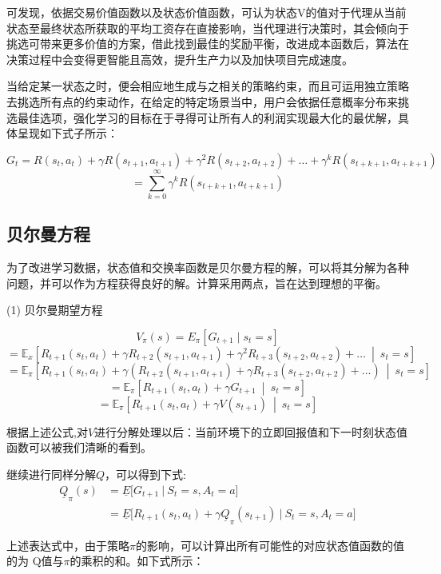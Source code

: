 可发现，依据交易价值函数以及状态价值函数，可认为状态V的值对于代理从当前状态至最终状态所获取的平均工资存在直接影响，当代理进行决策时，其会倾向于挑选可带来更多价值的方案，借此找到最佳的奖励平衡，改进成本函数后，算法在决策过程中会变得更智能且高效，提升生产力以及加快项目完成速度。

当给定某一状态之时，便会相应地生成与之相关的策略约束，而且可运用独立策略去挑选所有点的约束动作，在给定的特定场景当中，用户会依据任意概率分布来挑选最佳选项，强化学习的目标在于寻得可让所有人的利润实现最大化的最优解，具体呈现如下式子所示：

\[
G_t = R(s_t, a_t) + \gamma R(s_{t+1}, a_{t+1}) + \gamma^2 R(s_{t+2}, a_{t+2}) + \ldots + \gamma^k R(s_{t+k+1}, a_{t+k+1})
\]
\[
= \sum_{k=0}^\infty \gamma^k R(s_{t+k+1}, a_{t+k+1})
\]

\subsection{贝尔曼方程}

为了改进学习数据，状态值和交换率函数是贝尔曼方程的解，可以将其分解为各种问题，并可以作为方程获得良好的解\cite{franccois2018introduction}。计算采用两点，旨在达到理想的平衡。

(1) 贝尔曼期望方程

\[
V_{\pi}(s) = E_{\pi} \left[ G_{t+1} \mid s_{t} = s \right]
\]
\[
= \mathbb{E}_x \left[ R_{t+1}(s_t, a_t) + \gamma R_{t+2}(s_{t+1}, a_{t+1}) + \gamma^2 R_{t+3}(s_{t+2}, a_{t+2}) + \ldots \ \middle| \ s_t = s \right]
\]
\[
= \mathbb{E}_{\pi} \left[ R_{t+1}(s_t, a_t) + \gamma \left( R_{t+2}(s_{t+1}, a_{t+1}) + \gamma R_{t+3}(s_{t+2}, a_{t+2}) + \ldots \right) \ \middle| \ s_t = s \right]
\]
\[
= \mathbb{E}_{\pi} \left[ R_{t+1}(s_t, a_t) + \gamma G_{t+1} \ \middle| \ s_t = s \right]
\]
\[
= \mathbb{E}_{\pi} \left[ R_{t+1}(s_t, a_t) + \gamma V(s_{t+1}) \ \middle| \ s_t = s \right]
\]

根据上述公式,对${V}$进行分解处理以后：当前环境下的立即回报值和下一时刻状态值函数可以被我们清晰的看到。

继续进行同样分解${Q}$，可以得到下式:
\begin{align*}
	\underline{Q}_\pi(s) &= \underline{E} \Big[ G_{t+1} \ \Big| \ S_t = s, A_t = a \Big] \\
	&= \underline{E} \Big[ R_{t+1}(s_t, a_t) + \gamma \underline{Q}_\pi(s_{t+1}) \ \Big| \ S_t = s, A_t = a \Big]
\end{align*}

上述表达式中，由于策略$\pi$的影响，可以计算出所有可能性的对应状态值函数的值的为
Q值与$\pi$的乘积的和。如下式所示：

